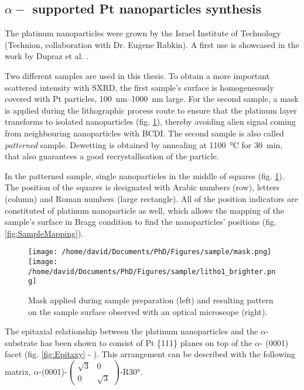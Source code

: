 \subsection{$\alpha-$ supported Pt nanoparticles synthesis}\label{sec:PtParticles}

The platinum nanoparticles were grown by the Israel Institute of Technology (Technion, collaboration with Dr. Eugene Rabkin).
A first use is showcased in the work by Dupraz et al. \parencite*{Dupraz2017}.

Two different samples are used in this thesis.
To obtain a more important scattered intensity with SXRD, the first sample's surface is homogeneously covered with Pt particles, \qtyrange{100}{1000}{\nm} large.
For the second sample, a mask is applied during the lithographic process route to ensure that the platinum layer transforms to isolated nanoparticles (fig. \ref{fig:Mask}), thereby avoiding alien signal coming from neighbouring nanoparticles with BCDI.
The second sample is also called \textit{patterned} sample.
Dewetting is obtained by annealing at \qty{1100}{\degreeCelsius} for \qty{30}{\minute}, that also guarantees a good recrystallisation of the particle.

In the patterned sample, single nanoparticles in the middle of squares (fig. \ref{fig:Mask}).
The position of the squares is designated with Arabic numbers (row), letters (column) and Roman numbers (large rectangle).
All of the position indicators are constituted of platinum nanoparticle as well, which allows the mapping of the sample's surface in Bragg condition to find the nanoparticles' positions (fig. \ref{fig:SampleMapping}).

\begin{figure}[!htb]
    \centering
    \texttt{[image: /home/david/Documents/PhD/Figures/sample/mask.png]}
    \texttt{[image: /home/david/Documents/PhD/Figures/sample/litho1\_brighter.png]}
    \caption{
        Mask applied during sample preparation (left) and resulting pattern on the sample surface observed with an optical microscope (right).
    }
    \label{fig:Mask}
\end{figure}

The epitaxial relationship between the platinum nanoparticles and the $\alpha$- substrate has been shown to consist of Pt \{111\} planes on top of the $\alpha$- (0001) facet (fig. \ref{fig:Epitaxy} - \cite{Farrow1993}).
This arrangement can be described with the following matrix, $\alpha$-(0001)-$\begin{pmatrix} \sqrt{3} & 0\\ 0 & \sqrt{3} \end{pmatrix}$-R\ang{30}.

